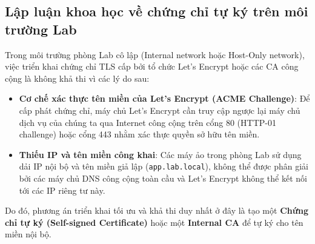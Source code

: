 \documentclass[a4paper,12pt]{article}
\begin{document}
\subsection{Lập luận khoa học về chứng chỉ tự ký trên môi trường Lab}
Trong môi trường phòng Lab cô lập (Internal network hoặc Host-Only network), việc triển khai chứng chỉ TLS cấp bởi tổ chức Let's Encrypt hoặc các CA công cộng là không khả thi vì các lý do sau:
\begin{itemize}
    \item \textbf{Cơ chế xác thực tên miền của Let's Encrypt (ACME Challenge)}: Để cấp phát chứng chỉ, máy chủ Let's Encrypt cần truy cập ngược lại máy chủ dịch vụ của chúng ta qua Internet công cộng trên cổng 80 (HTTP-01 challenge) hoặc cổng 443 nhằm xác thực quyền sở hữu tên miền.
    \item \textbf{Thiếu IP và tên miền công khai}: Các máy ảo trong phòng Lab sử dụng dải IP nội bộ và tên miền giả lập (\texttt{app.lab.local}), không thể được phân giải bởi các máy chủ DNS công cộng toàn cầu và Let's Encrypt không thể kết nối tới các IP riêng tư này.
\end{itemize}
Do đó, phương án triển khai tối ưu và khả thi duy nhất ở đây là tạo một \textbf{Chứng chỉ tự ký (Self-signed Certificate)} hoặc một \textbf{Internal CA} để tự ký cho tên miền nội bộ.
\end{document}
